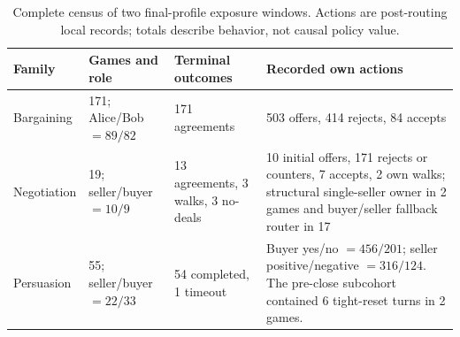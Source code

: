 \begin{table}[h]
\centering
\small
\caption{Complete census of two final-profile exposure windows. Actions are
post-routing local records; totals describe behavior, not causal policy value.}
\label{tab:final_era_census}
\begin{tabularx}{\linewidth}{@{}p{2.2cm}p{3.2cm}p{4.2cm}Y@{}}
\toprule
Family & Games and role & Terminal outcomes & Recorded own actions \\
\midrule
Bargaining & 171; Alice/Bob $=89/82$ & 171 agreements & 503 offers, 414 rejects, 84 accepts \\
Negotiation & 19; seller/buyer $=10/9$ & 13 agreements, 3 walks, 3 no-deals & 10 initial offers, 171 rejects or counters, 7 accepts, 2 own walks; structural single-seller owner in 2 games and buyer/seller fallback router in 17 \\
Persuasion & 55; seller/buyer $=22/33$ & 54 completed, 1 timeout & Buyer yes/no $=456/201$; seller positive/negative $=316/124$. The pre-close subcohort contained 6 tight-reset turns in 2 games. \\
\bottomrule
\end{tabularx}
\end{table}

